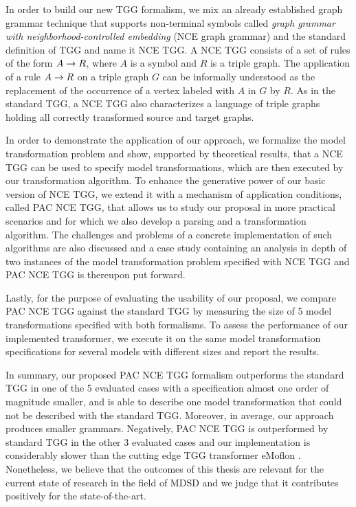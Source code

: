 In order to build our new TGG formalism, we mix an already established graph grammar technique that supports non-terminal symbols called \emph{graph grammar with neighborhood-controlled embedding} (NCE graph grammar) \cite{janssens1982graph} and the standard definition of TGG \cite{schurr1994specification} and name it NCE TGG. A NCE TGG consists of a set of rules of the form $A \to R$, where $A$ is a symbol and $R$ is a triple graph. The application of a rule $A \to R$ on a triple graph $G$ can be informally understood as the replacement of the occurrence of a vertex labeled with $A$ in $G$ by $R$. As in the standard TGG, a NCE TGG also characterizes a language of triple graphs holding all correctly transformed source and target graphs.

In order to demonstrate the application of our approach, we formalize the model transformation problem and show, supported by theoretical results, that a NCE TGG can be used to specify model transformations, which are then executed by our transformation algorithm. To enhance the generative power of our basic version of NCE TGG, we extend it with a mechanism of application conditions, called PAC NCE TGG, that allows us to study our proposal in more practical scenarios and for which we also develop a parsing and a transformation algorithm. The challenges and problems of a concrete implementation of such algorithms are also discussed and a case study containing an analysis in depth of two instances of the model transformation problem specified with NCE TGG and PAC NCE TGG is thereupon put forward.

Lastly, for the purpose of evaluating the usability of our proposal, we compare PAC NCE TGG against the standard TGG by measuring the size of 5 model transformations specified with both formalisms. To assess the performance of our implemented transformer, we execute it on the same model transformation specifications for several models with different sizes and report the results.

In summary, our proposed PAC NCE TGG formalism outperforms the standard TGG in one of the 5 evaluated cases with a specification almost one order of magnitude smaller, and is able to describe one model transformation that could not be described with the standard TGG. Moreover, in average, our approach produces smaller grammars. Negatively, PAC NCE TGG is outperformed by standard TGG in the other 3 evaluated cases and our implementation is considerably slower than the cutting edge TGG transformer eMoflon \cite{leblebici2014developing}. Nonetheless, we believe that the outcomes of this thesis are relevant for the current state of research in the field of MDSD and we judge that it contributes positively for the state-of-the-art.

